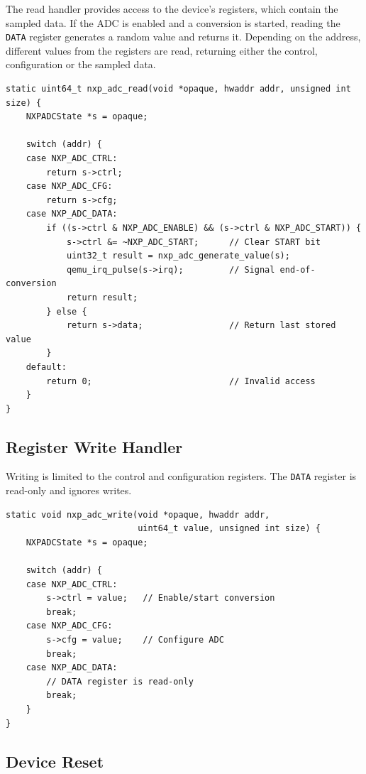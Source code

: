 \documentclass{article}
\begin{document}
The read handler provides access to the device’s registers, which contain the sampled data.  
If the ADC is enabled and a conversion is started, reading the \texttt{DATA}
register generates a random value and returns it. Depending on the address, different values from the registers are read, returning either the control, configuration or the sampled data.

\begin{verbatim}
static uint64_t nxp_adc_read(void *opaque, hwaddr addr, unsigned int size) {
    NXPADCState *s = opaque;

    switch (addr) {
    case NXP_ADC_CTRL:
        return s->ctrl;
    case NXP_ADC_CFG:
        return s->cfg;
    case NXP_ADC_DATA:
        if ((s->ctrl & NXP_ADC_ENABLE) && (s->ctrl & NXP_ADC_START)) {
            s->ctrl &= ~NXP_ADC_START;      // Clear START bit
            uint32_t result = nxp_adc_generate_value(s);
            qemu_irq_pulse(s->irq);         // Signal end-of-conversion
            return result;
        } else {
            return s->data;                 // Return last stored value
        }
    default:
        return 0;                           // Invalid access
    }
}
\end{verbatim}

\subsection{Register Write Handler}

Writing is limited to the control and configuration registers.  
The \texttt{DATA} register is read-only and ignores writes.

\begin{verbatim}
static void nxp_adc_write(void *opaque, hwaddr addr,
                          uint64_t value, unsigned int size) {
    NXPADCState *s = opaque;

    switch (addr) {
    case NXP_ADC_CTRL:
        s->ctrl = value;   // Enable/start conversion
        break;
    case NXP_ADC_CFG:
        s->cfg = value;    // Configure ADC
        break;
    case NXP_ADC_DATA:
        // DATA register is read-only
        break;
    }
}
\end{verbatim}

\subsection{Device Reset}
\end{document}
